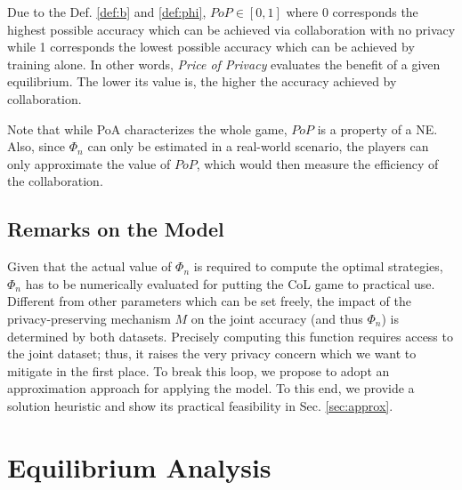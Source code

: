\documentclass[USenglish,oneside,twocolumn]{article}
\theoremstyle{plain}
\begin{document}
    Due to the Def. \ref{def:b} and \ref{def:phi}, $PoP\in[0,1]$ where 0 corresponds the highest possible accuracy which can be achieved via collaboration with no privacy while 1 corresponds the lowest possible accuracy which can be achieved by training alone. In other words, \textit{Price of Privacy} evaluates the benefit of a given equilibrium. The lower its value is, the higher the accuracy achieved by collaboration. %
    
    Note that while PoA characterizes the whole game, $PoP$ is a property of a NE. Also, since $\Phi_n$ can only be estimated in a real-world scenario, the players can only approximate the value of $PoP$, which would then measure the efficiency of the collaboration.
    
    \vspace{-0.5cm}
    \subsection{Remarks on the Model}
    \vspace{-0.25cm}
    
    Given that the actual value of $\Phi_n$ is required to compute the optimal strategies, $\Phi_n$ has to be numerically evaluated for putting the CoL game to practical use.
    Different from other parameters which can be set freely, the impact of the privacy-preserving mechanism $M$ on the joint accuracy (and thus $\Phi_n$) is determined by both datasets. Precisely computing this function requires access to the joint dataset; thus, it raises the very privacy concern which we want to mitigate in the first place. To break this loop, we propose to adopt an approximation approach for applying the model. To this end, we provide a solution heuristic and show its practical feasibility in Sec. \ref{sec:approx}.  

    \vspace{-0.5cm}
    \section{Equilibrium Analysis}
    \label{sec:anal}
    \vspace{-0.25cm}
    
    
\end{document}
